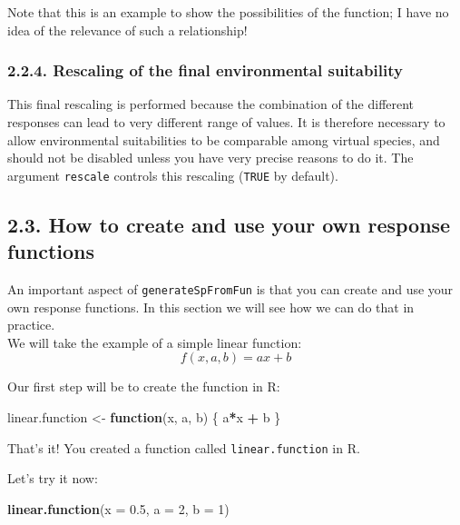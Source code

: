 \documentclass[]{article}
\newenvironment{Shaded}{\begin{snugshade}}{\end{snugshade}}
\newcommand{\KeywordTok}[1]{\textcolor[rgb]{0.13,0.29,0.53}{\textbf{#1}}}
\newcommand{\DataTypeTok}[1]{\textcolor[rgb]{0.13,0.29,0.53}{#1}}
\newcommand{\DecValTok}[1]{\textcolor[rgb]{0.00,0.00,0.81}{#1}}
\newcommand{\FloatTok}[1]{\textcolor[rgb]{0.00,0.00,0.81}{#1}}
\newcommand{\StringTok}[1]{\textcolor[rgb]{0.31,0.60,0.02}{#1}}
\newcommand{\ControlFlowTok}[1]{\textcolor[rgb]{0.13,0.29,0.53}{\textbf{#1}}}
\newcommand{\OperatorTok}[1]{\textcolor[rgb]{0.81,0.36,0.00}{\textbf{#1}}}
\newcommand{\NormalTok}[1]{#1}
\begin{document}
Note that this is an example to show the possibilities of the function;
I have no idea of the relevance of such a relationship!

\subsubsection{2.2.4. Rescaling of the final environmental
suitability}\label{rescaling-of-the-final-environmental-suitability}

This final rescaling is performed because the combination of the
different responses can lead to very different range of values. It is
therefore necessary to allow environmental suitabilities to be
comparable among virtual species, and should not be disabled unless you
have very precise reasons to do it. The argument \texttt{rescale}
controls this rescaling (\texttt{TRUE} by default).

\hypertarget{how-to-create-and-use-your-own-response-functions}{\subsection{2.3.
How to create and use your own response
functions}\label{how-to-create-and-use-your-own-response-functions}}

An important aspect of \texttt{generateSpFromFun} is that you can create
and use your own response functions. In this section we will see how we
can do that in practice.\\
We will take the example of a simple linear function:
\[ f(x, a, b) = ax + b\]

Our first step will be to create the function in R:

\begin{Shaded}
\begin{Highlighting}[]
\NormalTok{linear.function <-}\StringTok{ }\ControlFlowTok{function}\NormalTok{(x, a, b)}
\NormalTok{\{}
\NormalTok{  a}\OperatorTok{*}\NormalTok{x }\OperatorTok{+}\StringTok{ }\NormalTok{b}
\NormalTok{\}}
\end{Highlighting}
\end{Shaded}

That's it! You created a function called \texttt{linear.function} in R.

Let's try it now:

\begin{Shaded}
\begin{Highlighting}[]
\KeywordTok{linear.function}\NormalTok{(}\DataTypeTok{x =} \FloatTok{0.5}\NormalTok{, }\DataTypeTok{a =} \DecValTok{2}\NormalTok{, }\DataTypeTok{b =} \DecValTok{1}\NormalTok{)}
\end{Highlighting}
\end{Shaded}
\end{document}
